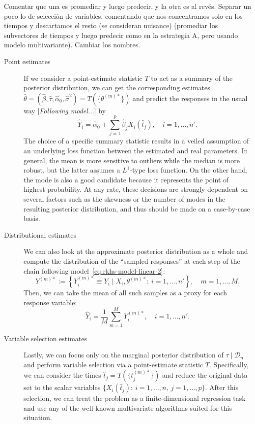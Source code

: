 \documentclass[ba]{imsart}
\numberwithin{equation}{section}
\theoremstyle{plain}
\newenvironment{comment}[1][comment-red]
{
\noindent \color{#1}
}
{
\color{black}
}
\newcommand\incomment[2][comment-red]{\color{#1}[\textit{#2}]\color{black}}
\begin{document}
\begin{comment}
  Comentar que una es promediar y luego predecir, y la otra es al revés. Separar un poco lo de selección de variables, comentando que nos concentramos solo en los tiempos y descartamos el resto (se consideran nuisance) (promediar los subvectores de tiempos y luego predecir como en la estrategia A, pero usando modelo multivariante). Cambiar los nombres.
\end{comment}

\begin{description}
  \item[Point estimates] If we consider a point-estimate statistic \(T\) to act as a summary of the posterior distribution, we can get the corresponding estimates \(\hat{\theta}=(\hat \beta, \hat \tau, \hat{\alpha}_0, \hat{\sigma}^2) = T(\{\theta^{(m)*}\})\) and predict the responses in the usual way \incomment{Following model...} by
  \[
    \hat Y_i = \hat{\alpha}_0 + \sum_{j=1}^p \hat{\beta}_j X_i(\hat{t}_j), \quad i=1,\dots, n'.
  \]
  The choice of a specific summary statistic results in a veiled assumption of an underlying loss function between the estimated and real parameters. In general, the mean is more sensitive to outliers while the median is more robust, but the latter assumes a \(L^1\)-type loss function. On the other hand, the mode is also a good candidate because it represents the point of highest probability. At any rate, these decisions are strongly dependent on several factors such as the skewness or the number of modes in the resulting posterior distribution, and thus should be made on a case-by-case basis.
  \item[Distributional estimates] We can also look at the approximate posterior distribution as a whole and compute the distribution of the ``sampled responses'' at each step of the chain following model~\eqref{eq:rkhs-model-linear-2}:
  \[
  Y^{(m)*} := \left\{Y_i^{(m)*} \equiv Y_i \mid X_i, \theta^{(m)*}:\ i=1,\dots,n'\right\}, \quad m=1,\dots,M.
  \]
  Then, we can take the mean of all such samples as a proxy for each response variable:
  \[
  \hat Y_i = \frac{1}{M}\sum_{m=1}^M Y_i^{(m)*}, \quad i=1,\dots,n'.
  \]
  \item[Variable selection estimates] Lastly, we can focus only on the marginal posterior distribution of \(\tau\mid\mathcal D_n\) and perform variable selection via a point-estimate statistic \(T\). Specifically, we can consider the times \(\hat t_j = T(\{t_j^{(m)*}\})\) and reduce the original data set to the scalar variables \(\{X_i(\hat t_j):\ i=1, \dots,n, \ j=1,\dots,p\}\). After this selection, we can treat the problem as a finite-dimensional regression task and use any of the well-known multivariate algorithms suited for this situation.
\end{description}
\end{document}

